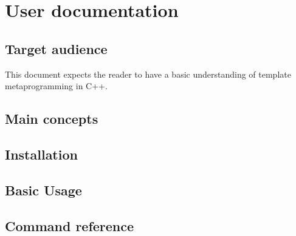 
\chapter{User documentation}

\section{Target audience}

This document expects the reader to have a basic understanding of template
metaprogramming in C++.

\section{Main concepts}

\section{Installation}

\section{Basic Usage}

\section{Command reference}

